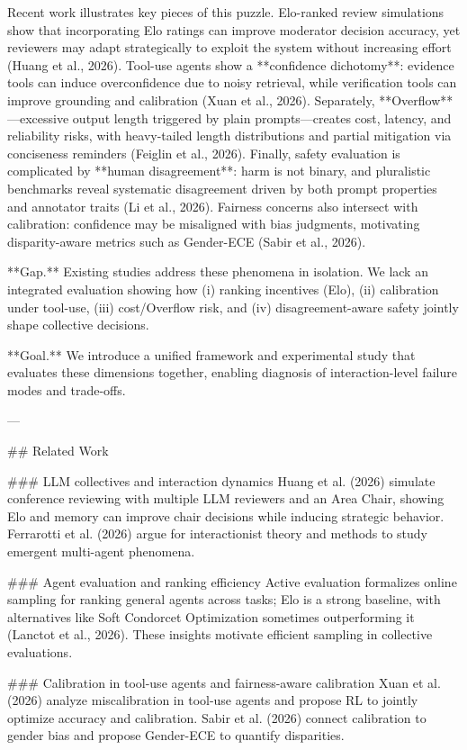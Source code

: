 Recent work illustrates key pieces of this puzzle. Elo-ranked review simulations show that incorporating Elo ratings can improve moderator decision accuracy, yet reviewers may adapt strategically to exploit the system without increasing effort (Huang et al., 2026). Tool-use agents show a **confidence dichotomy**: evidence tools can induce overconfidence due to noisy retrieval, while verification tools can improve grounding and calibration (Xuan et al., 2026). Separately, **Overflow**—excessive output length triggered by plain prompts—creates cost, latency, and reliability risks, with heavy-tailed length distributions and partial mitigation via conciseness reminders (Feiglin et al., 2026). Finally, safety evaluation is complicated by **human disagreement**: harm is not binary, and pluralistic benchmarks reveal systematic disagreement driven by both prompt properties and annotator traits (Li et al., 2026). Fairness concerns also intersect with calibration: confidence may be misaligned with bias judgments, motivating disparity-aware metrics such as Gender-ECE (Sabir et al., 2026).

**Gap.** Existing studies address these phenomena in isolation. We lack an integrated evaluation showing how (i) ranking incentives (Elo), (ii) calibration under tool-use, (iii) cost/Overflow risk, and (iv) disagreement-aware safety jointly shape collective decisions.

**Goal.** We introduce a unified framework and experimental study that evaluates these dimensions together, enabling diagnosis of interaction-level failure modes and trade-offs.

---

## Related Work  

### LLM collectives and interaction dynamics  
Huang et al. (2026) simulate conference reviewing with multiple LLM reviewers and an Area Chair, showing Elo and memory can improve chair decisions while inducing strategic behavior. Ferrarotti et al. (2026) argue for interactionist theory and methods to study emergent multi-agent phenomena.

### Agent evaluation and ranking efficiency  
Active evaluation formalizes online sampling for ranking general agents across tasks; Elo is a strong baseline, with alternatives like Soft Condorcet Optimization sometimes outperforming it (Lanctot et al., 2026). These insights motivate efficient sampling in collective evaluations.

### Calibration in tool-use agents and fairness-aware calibration  
Xuan et al. (2026) analyze miscalibration in tool-use agents and propose RL to jointly optimize accuracy and calibration. Sabir et al. (2026) connect calibration to gender bias and propose Gender-ECE to quantify disparities.

